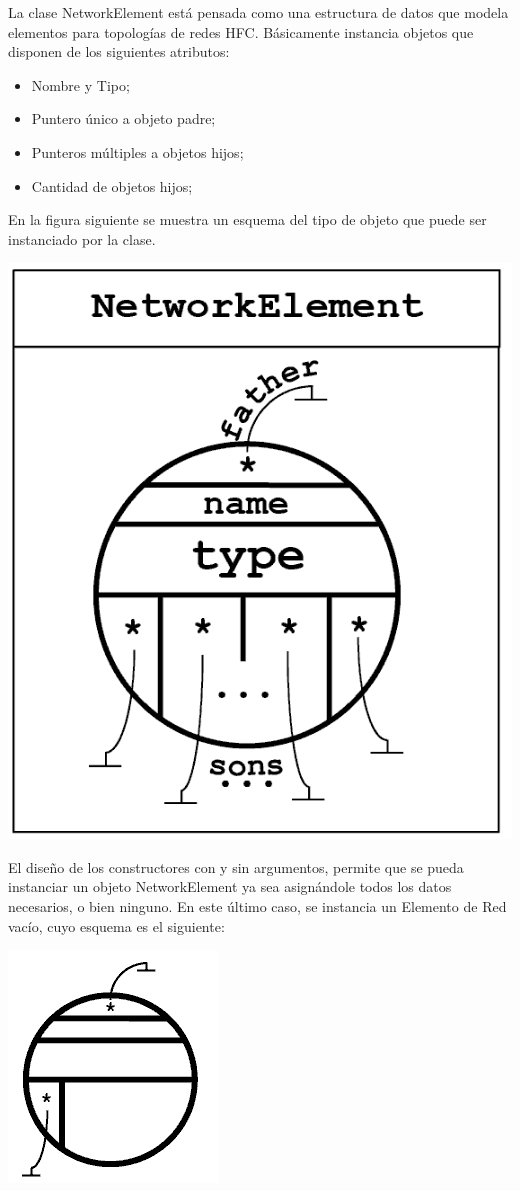 \documentclass[10pt,a4paper]{article}
\begin{document}
La clase NetworkElement está pensada como una estructura de datos que modela elementos para topologías de redes HFC. Básicamente instancia objetos que disponen de los siguientes atributos:
\begin{itemize}
\item Nombre y Tipo;
\item Puntero único a objeto padre;
\item Punteros múltiples a objetos hijos;
\item Cantidad de objetos hijos;
\end{itemize}
 En la figura siguiente se muestra un esquema del tipo de objeto que puede ser instanciado por la clase.\\
\begin{center}
\includegraphics[scale=0.25]{Images/NetworkElement_Object.png}
\end{center}
El diseño de los constructores con y sin argumentos, permite que se pueda instanciar un objeto NetworkElement ya sea asignándole todos los datos necesarios, o bien ninguno. En este último caso, se instancia un Elemento de Red vacío, cuyo esquema es el siguiente:\\
\begin{center}
\includegraphics[scale=0.25]{Images/NetworkElement_empty.png}
\end{center}
\end{document}
